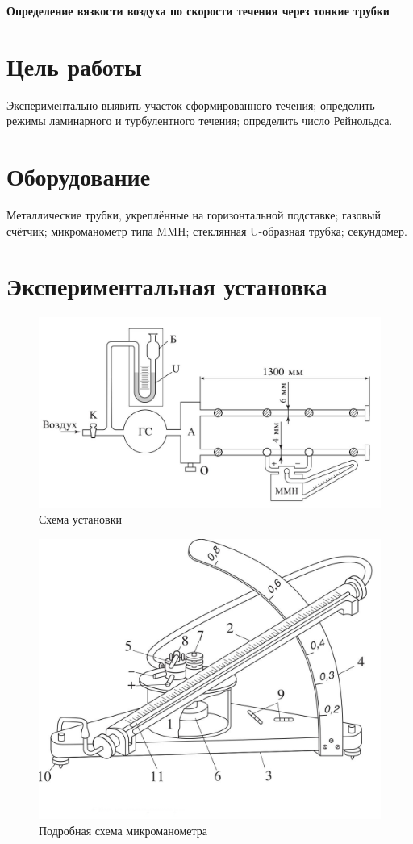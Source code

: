 \documentclass[a4paper, fontsize=14pt]{article}
\begin{document}
\parindent=1cm


\huge
\centering
\textbf{Определение вязкости воздуха по скорости течения через тонкие трубки}

\raggedright
\large
\section*{Цель работы}
Экспериментально выявить участок сформированного течения;
 определить режимы ламинарного и турбулентного течения;
 определить число Рейнольдса.
\section*{Оборудование}
Металлические трубки, укреплённые на горизонтальной подставке; газовый счётчик;
микроманометр типа MMH; стеклянная U-образная трубка; секундомер.
\section*{Экспериментальная установка}
\begin{figure}[H]
\center
\includegraphics[scale=0.25]{asd.png}
\caption{Схема установки}
\end{figure}

\begin{figure}[H]
\center
\includegraphics[scale=0.25]{mic.png}
\caption{Подробная схема микроманометра}
\end{figure}
\end{document}
